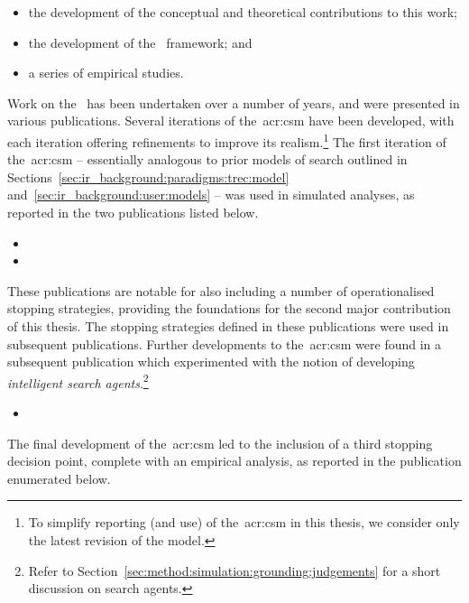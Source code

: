 \begin{itemize}
    \item{the development of the conceptual and theoretical contributions to this work;}
    \item{the development of the \simiir~framework; and}
    \item{a series of empirical studies.}
\end{itemize}

\noindent
{}
Work on the~ has been undertaken over a number of years, and were presented in various publications. Several iterations of the~\gls{acr:csm} have been developed, with each iteration offering refinements to improve its realism.\footnote{To simplify reporting (and use) of the~\gls{acr:csm} in this thesis, we consider only the latest revision of the model.} The first iteration of the~\gls{acr:csm} -- essentially analogous to prior models of search outlined in Sections~\ref{sec:ir_background:paradigms:trec:model} and~\ref{sec:ir_background:user:models} -- was used in simulated analyses, as reported in the two publications listed below.

\begin{itemize}
    \item{}
    \item{}
\end{itemize}

These publications are notable for also including a number of operationalised stopping strategies, providing the foundations for the second major contribution of this thesis. The stopping strategies defined in these publications were used in subsequent publications. Further developments to the~\gls{acr:csm} were found in a subsequent publication which experimented with the notion of developing \emph{intelligent search agents}.\footnote{Refer to Section~\ref{sec:method:simulation:grounding:judgements} for a short discussion on search agents.}

\begin{itemize}
    \item{}
\end{itemize}

The final development of the~\gls{acr:csm} led to the inclusion of a third stopping decision point, complete with an empirical analysis, as reported in the publication enumerated below.



